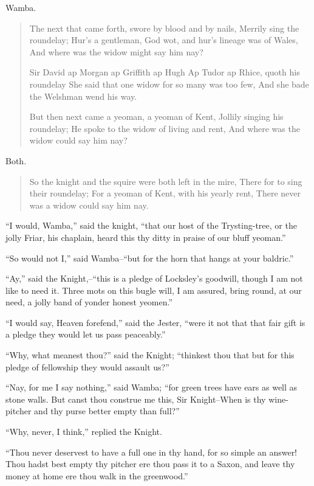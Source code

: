 Wamba.

\begin{quote}
The next that came forth, swore by blood and by nails,
Merrily sing the roundelay;
Hur's a gentleman, God wot, and hur's lineage was of Wales,
And where was the widow might say him nay?

Sir David ap Morgan ap Griffith ap Hugh
Ap Tudor ap Rhice, quoth his roundelay
She said that one widow for so many was too few,
And she bade the Welshman wend his way.

But then next came a yeoman, a yeoman of Kent,
Jollily singing his roundelay;
He spoke to the widow of living and rent,
And where was the widow could say him nay?
\end{quote}

Both.

\begin{quote}
So the knight and the squire were both left in the mire,
There for to sing their roundelay;
For a yeoman of Kent, with his yearly rent,
There never was a widow could say him nay.
\end{quote}

``I would, Wamba,'' said the knight, ``that our host of the
Trysting-tree, or the jolly Friar, his chaplain, heard this thy ditty in
praise of our bluff yeoman.''

``So would not I,'' said Wamba--``but for the horn that hangs at your
baldric.''

``Ay,'' said the Knight,--``this is a pledge of Locksley's goodwill,
though I am not like to need it. Three mots on this bugle will, I am
assured, bring round, at our need, a jolly band of yonder honest
yeomen.''

``I would say, Heaven forefend,'' said the Jester, ``were it not that
that fair gift is a pledge they would let us pass peaceably.''

``Why, what meanest thou?'' said the Knight; ``thinkest thou that but
for this pledge of fellowship they would assault us?''

``Nay, for me I say nothing,'' said Wamba; ``for green trees have ears
as well as stone walls. But canst thou construe me this, Sir
Knight--When is thy wine-pitcher and thy purse better empty than full?''

``Why, never, I think,'' replied the Knight.

``Thou never deservest to have a full one in thy hand, for so simple an
answer! Thou hadst best empty thy pitcher ere thou pass it to a Saxon,
and leave thy money at home ere thou walk in the greenwood.''

